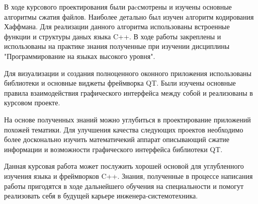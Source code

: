 \label{sec:outro}

В ходе курсового проектирования были раcсмотрены и изучены основные алгоритмы сжатия файлов.
Наиболее детально был изучен алгоритм кодирования Хаффмана.
Для реализации данного алгоритма использованы встроенные функции и структуры даных языка C++.
В ходе работы закреплены и использованы на практике знания полученные при изучении дисциплины "Программирование на языках высокого уровня".



Для визуализации и создания полноценного оконного приложения использованы библиотеки и основные виджеты фреймворка QT.
Были изучены основные правила взаимодействия графического интерфейса между собой и реализованы в курсовом проекте.



На основе полученных знаний можно углубиться в проектирование приложений похожей тематики.
Для улучшения качества следующих проектов необходимо более досконально изучить математичекий аппарат описывающий сжатие информации и возможности графического интерфейса библиотеки QT.



Данная курсовая работа может послужить хорошей основой для углубленного изучения языка и фреймворков C++.
Знания, полученные в процессе написания работы пригодятся в ходе дальнейшего обучения на специальности и помогут реализовать себя в будущей карьере инженера-системотехника.